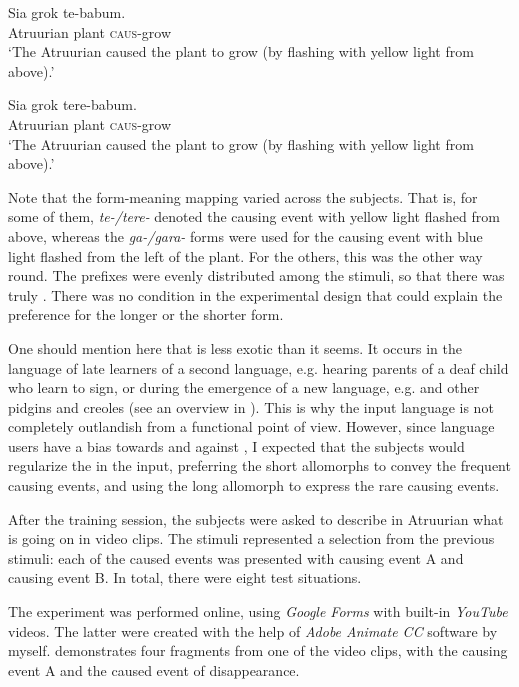 \documentclass[output=paper]{langsci/langscibook}
\begin{document}
\ea
\ea
\gll  Sia    grok  te-babum.\\
       Atruurian   plant   \textsc{caus}{}-grow\\
\glt ‘The Atruurian caused the plant to grow (by flashing with yellow light from above).'

\ex
\gll  Sia    grok  tere-babum.\\
       Atruurian   plant   \textsc{caus}{}-grow\\
\glt ‘The Atruurian caused the plant to grow (by flashing with yellow light from above).'
\z
\z

Note that the form-meaning mapping varied across the subjects. That is, for some of them, \textit{te-/tere-} denoted the causing event with yellow light flashed from above, whereas the \textit{ga-/gara-} forms were used for the causing event with blue light flashed from the left of the plant. For the others, this was the other way round. The prefixes were evenly distributed among the stimuli, so that there was truly . There was no condition in the experimental design that could explain the preference for the longer or the shorter form.  

One should mention here that  is less exotic than it seems. It occurs in the language of late learners of a second language, e.g. hearing parents of a deaf child who learn to sign, or during the emergence of a new language, e.g.  and other pidgins and creoles (see an overview in \citealt{HudsonKamNewport2009}). This is why the input language is not completely outlandish from a functional point of view. However, since language users have a bias towards  and against , I expected that the subjects would regularize the  in the input, preferring the short allomorphs to convey the frequent causing events, and using the long allomorph to express the rare causing events.

After the training session, the subjects were asked to describe in Atruurian what is going on in video clips. The stimuli represented a selection from the previous stimuli: each of the caused events was presented with causing event A and causing event B. In total, there were eight test situations. 

The experiment was performed online, using \textit{Google Forms} with built-in \textit{You\-Tube} videos. The latter were created with the help of \textit{Adobe Animate CC} software by myself.  demonstrates four fragments from one of the video clips, with the causing event A and the caused event of disappearance.
\end{document}
